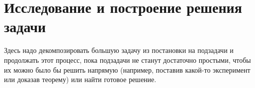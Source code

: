 \chapter{Исследование и построение решения задачи}
\label{sec:Chapter3}
Здесь надо декомпозировать большую задачу из постановки на подзадачи и продолжать этот процесс, пока подзадачи не станут достаточно простыми, чтобы их можно было бы решить напрямую (например, поставив какой-то эксперимент или доказав теорему) или найти готовое решение.

\newpage